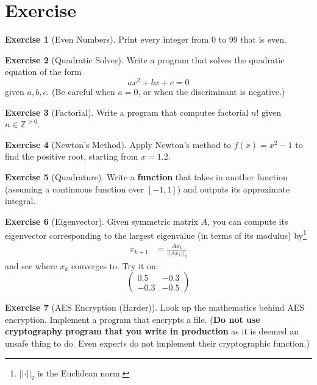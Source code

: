\documentclass[12pt, a4paper]{article}
\theoremstyle{definition}
\newtheorem{exercise}{Exercise}
\begin{document}
\section{Exercise}
\begin{exercise}[Even Numbers]
    Print every integer from 0 to 99 that is even.
\end{exercise}
\begin{exercise}[Quadratic Solver]
    Write a program that solves the quadratic equation of the form
    \begin{equation*}
        ax^2 + bx + c = 0
    \end{equation*}
    given $a,b,c$.
    (Be careful when $a=0$, or when the discriminant is negative.)
\end{exercise}
\begin{exercise}[Factorial]
    Write a program that computes factorial $n!$ given $n \in \mathbb{Z}^{ \geq 0}$.
\end{exercise}
\begin{exercise}[Newton's Method]
    Apply Newton's method to $f(x) = x^2 - 1$ to find the positive root,
    starting from $x = 1.2$.
\end{exercise}
\begin{exercise}[Quadrature]
    Write a \textbf{function} that takes in another function (assuming a continuous function over $\left[ -1,1 \right]$) and outputs its approximate integral.
\end{exercise}
\begin{exercise}[Eigenvector]
    Given symmetric matrix $A$, you can compute its eigenvector corresponding to the largest eigenvalue (in terms of its modulus) by\footnote{$\lvert \lvert \cdot \lvert \lvert_{2}$ is the Euclidean norm.}
    \begin{align*}
        x_{k+1} &= \frac{A x_k}{\lvert \lvert A x_k \lvert \lvert_{2}}
    \end{align*}
    and see where $x_k$ converges to.
    Try it on:
    \begin{equation*}
        \begin{pmatrix}
            0.5 & -0.3 \\
            -0.3 & -0.5
        \end{pmatrix}
    \end{equation*}
\end{exercise}
\begin{exercise}[AES Encryption (Harder)]
    Look up the mathematics behind AES encryption.
    Implement a program that encrypts a file.
    (\textbf{Do not use cryptography program that you write in production} as it is deemed an unsafe thing to do. Even experts do not implement their cryptographic function.)
\end{exercise}
\end{document}
